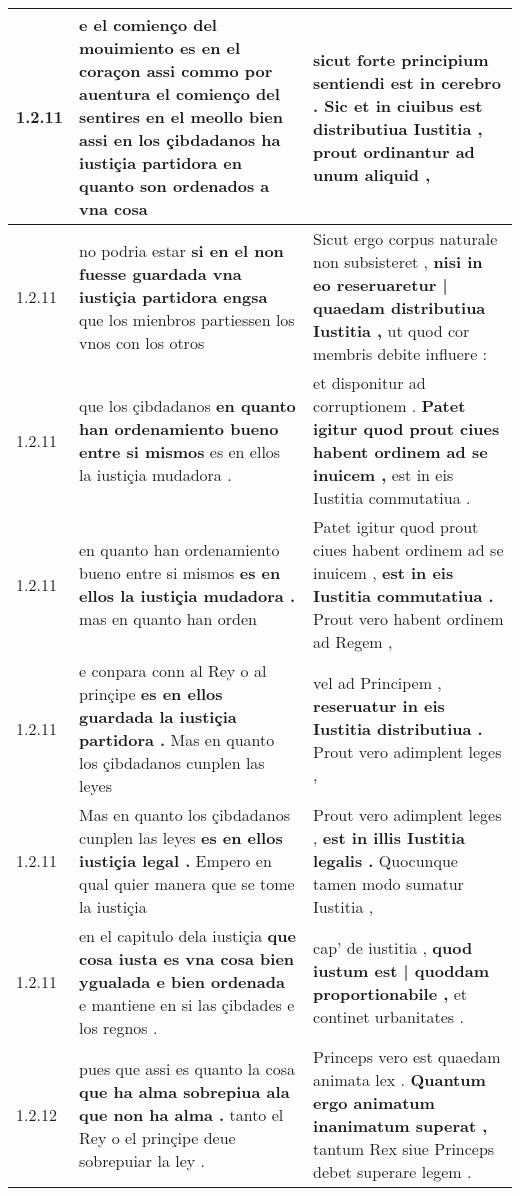 \begin{tabular}{|p{1cm}|p{6.5cm}|p{6.5cm}|}
1.2.11 & e el comienço del mouimiento es en el coraçon assi commo por auentura el comienço del sentires en el meollo bien \textbf{ assi en los çibdadanos ha iustiçia partidora en } quanto son ordenados a vna cosa & sicut forte principium sentiendi est in cerebro . \textbf{ Sic et in ciuibus est distributiua Iustitia , } prout ordinantur ad unum aliquid , \\\hline
1.2.11 & no podria estar \textbf{ si en el non fuesse guardada vna iustiçia partidora engsa } que los mienbros partiessen los vnos con los otros & Sicut ergo corpus naturale non subsisteret , \textbf{ nisi in eo reseruaretur | quaedam distributiua Iustitia , } ut quod cor membris debite influere : \\\hline
1.2.11 & que los çibdadanos \textbf{ en quanto han ordenamiento bueno entre si mismos } es en ellos la iustiçia mudadora . & et disponitur ad corruptionem . \textbf{ Patet igitur quod prout ciues habent ordinem ad se inuicem , } est in eis Iustitia commutatiua . \\\hline
1.2.11 & en quanto han ordenamiento bueno entre si mismos \textbf{ es en ellos la iustiçia mudadora . } mas en quanto han orden & Patet igitur quod prout ciues habent ordinem ad se inuicem , \textbf{ est in eis Iustitia commutatiua . } Prout vero habent ordinem ad Regem , \\\hline
1.2.11 & e conpara conn al Rey o al prinçipe \textbf{ es en ellos guardada la iustiçia partidora . } Mas en quanto los çibdadanos cunplen las leyes & vel ad Principem , \textbf{ reseruatur in eis Iustitia distributiua . } Prout vero adimplent leges , \\\hline
1.2.11 & Mas en quanto los çibdadanos cunplen las leyes \textbf{ es en ellos iustiçia legal . } Empero en qual quier manera que se tome la iustiçia & Prout vero adimplent leges , \textbf{ est in illis Iustitia legalis . } Quocunque tamen modo sumatur Iustitia , \\\hline
1.2.11 & en el capitulo dela iustiçia \textbf{ que cosa iusta es vna cosa bien ygualada e bien ordenada } e mantiene en si las çibdades e los regnos . & cap’ de iustitia , \textbf{ quod iustum est | quoddam proportionabile , } et continet urbanitates . \\\hline
1.2.12 & pues que assi es quanto la cosa \textbf{ que ha alma sobrepiua ala que non ha alma . } tanto el Rey o el prinçipe deue sobrepuiar la ley . & Princeps vero est quaedam animata lex . \textbf{ Quantum ergo animatum inanimatum superat , } tantum Rex siue Princeps debet superare legem . \\\hline

\end{tabular}
